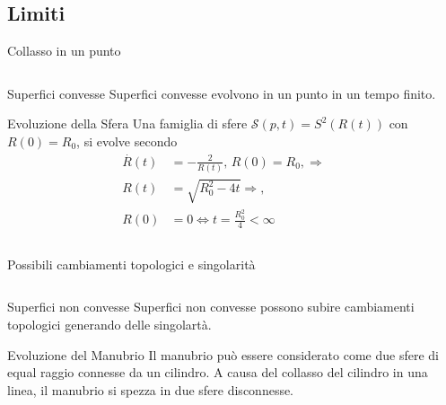\subsection{Limiti}
\begin{frame}{Collasso in un punto}
  \begin{columns}[c]
    \begin{column}{6cm}
      \begin{block}{Superfici convesse}
       Superfici convesse  evolvono in un
       punto in un tempo finito.
       \end{block}
      \begin{exampleblock}{Evoluzione della Sfera}
        Una famiglia di sfere $\mathcal{S}(p,t)=S^2(R(t))$ con
        $R(0)=R_0$, si evolve secondo
        \[
        \begin{aligned}
          \overset{\displaystyle.}{R}(t) &= -\frac{2}{R(t)},\,
          R(0)=R_0,\Rightarrow\\
          R(t)&=\sqrt{R_0^2-4t}\Rightarrow, \\
          R(0)&=0 \Longleftrightarrow t=\frac{R_0^2}{4}<\infty 
        \end{aligned}
        \]
      \end{exampleblock}
    \end{column}
    \begin{column}[c]{4cm}
       \begin{center}
     \end{center}
    \end{column}
    \end{columns}
\end{frame}
\begin{frame}{Possibili cambiamenti topologici e singolarità}
  \begin{columns}[c]
    \begin{column}{6cm}
      \begin{block}{Superfici non convesse}
       Superfici non convesse possono subire cambiamenti topologici
       generando delle singolartà. 
       \end{block}
      \begin{exampleblock}{Evoluzione del Manubrio}
        Il manubrio può essere considerato come due sfere di equal
        raggio connesse da un cilindro. A causa del collasso del
        cilindro in una linea, il manubrio si spezza in due sfere
        disconnesse.
      \end{exampleblock}
    \end{column}
    \begin{column}[c]{4cm}
       \begin{center}
     \end{center}
    \end{column}
    \end{columns}
\end{frame}

